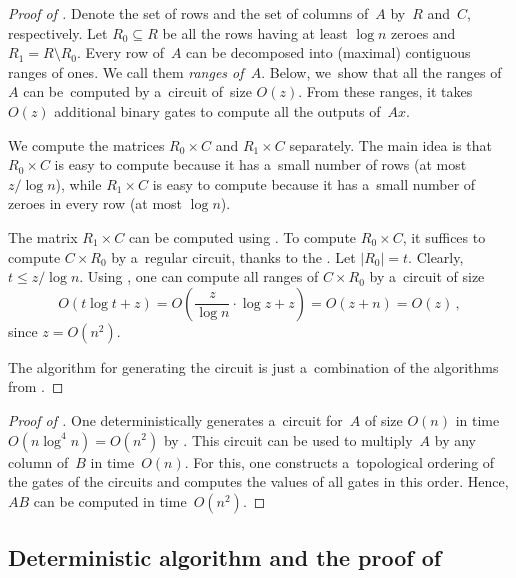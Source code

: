 \begin{proof}[Proof of {}]
Denote the set of rows and the set of columns of~$A$ by~$R$
and~$C$, respectively. Let $R_0 \subseteq R$ be all the rows
having at least $\log n$ zeroes and $R_1=R \setminus R_0$.
Every row of~$A$ can be decomposed into (maximal) contiguous ranges of ones. We
call them \emph{ranges of~$A$}.
Below, we~show that all the ranges of~$A$
can be~computed by a~circuit of~size $O(z)$.
From these
ranges, it takes $O(z)$ additional binary gates to compute all the outputs of~$Ax$.

We compute the matrices $R_0 \times C$ and $R_1 \times C$
separately. The main idea is that $R_0 \times C$ is easy to compute
because it has a~small number of rows (at most $z/\log n$), while $R_1 \times C$
is easy to compute because it has a~small number of zeroes in every row (at most
$\log n$).

The matrix $R_1 \times C$ can be computed using . To
compute $R_0 \times C$, it suffices to compute $C \times R_0$ by a~regular
circuit, thanks to the .
Let $|R_0|=t$. Clearly, $t \le z/\log n$.
Using , one can compute all
ranges of $C \times R_0$ by a~circuit of size
\[O(t\log t+z)=O\left(\frac{z}{\log n} \cdot \log z+z\right)=O(z+n)=O(z)\, ,\]
since $z =O(n^2)$.

The algorithm for generating the circuit is just a~combination
of the algorithms from  .
\end{proof}

\begin{proof}[Proof of {}]
	One deterministically generates a~circuit for~$A$ of size $O(n)$ in time
	$O(n\log^4n)=O(n^2)$ by .
	This circuit can be used to multiply~$A$ by any column of~$B$
	in time~$O(n)$. For this, one constructs a~topological ordering of the gates of
	the circuits and computes the values of all gates in this order. Hence, $AB$ can
	be computed in time~$O(n^2)$.
\end{proof}


\subsection{Deterministic algorithm and the proof of }\label{sec:deterministic}

